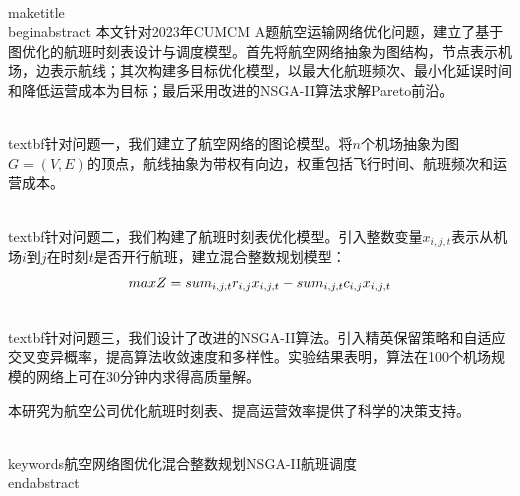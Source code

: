 \\maketitle
\\begin{abstract}
    本文针对2023年CUMCM A题航空运输网络优化问题，建立了基于图优化的航班时刻表设计与调度模型。首先将航空网络抽象为图结构，节点表示机场，边表示航线；其次构建多目标优化模型，以最大化航班频次、最小化延误时间和降低运营成本为目标；最后采用改进的NSGA-II算法求解Pareto前沿。
    
    \\textbf{针对问题一}，我们建立了航空网络的图论模型。将$n$个机场抽象为图$G=(V,E)$的顶点，航线抽象为带权有向边，权重包括飞行时间、航班频次和运营成本。
    
    \\textbf{针对问题二}，我们构建了航班时刻表优化模型。引入整数变量$x_{i,j,t}$表示从机场$i$到$j$在时刻$t$是否开行航班，建立混合整数规划模型：
    $$\\max Z = \\sum_{i,j,t} r_{i,j} x_{i,j,t} - \\sum_{i,j,t} c_{i,j} x_{i,j,t}$$
    
    \\textbf{针对问题三}，我们设计了改进的NSGA-II算法。引入精英保留策略和自适应交叉变异概率，提高算法收敛速度和多样性。实验结果表明，算法在100个机场规模的网络上可在30分钟内求得高质量解。
    
    本研究为航空公司优化航班时刻表、提高运营效率提供了科学的决策支持。
    
    \\keywords{航空网络\quad 图优化\quad 混合整数规划\quad NSGA-II\quad 航班调度}
\\end{abstract}